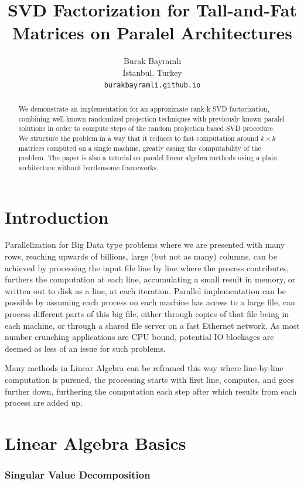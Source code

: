 \documentclass{article}
\title{SVD Factorization for Tall-and-Fat Matrices on Paralel Architectures}
\author{
  Burak Bayramlı \\
  İstanbul, Turkey\\
  \texttt{burakbayramli.github.io} 
}
\begin{document}
\maketitle

\begin{abstract}
We demonstrate an implementation for an approximate rank-k SVD factorization,
combining well-known randomized projection techniques with previously known
paralel solutions in order to compute steps of the random projection based SVD
procedure. We structure the problem in a way that it reduces to fast computation
around $k \times k$ matrices computed on a single machine, greatly easing the
computability of the problem. The paper is also a tutorial on paralel linear
algebra methods using a plain architecture without burdensome frameworks.
\end{abstract}



\section{Introduction}

Parallelization for Big Data type problems where we are presented with many
rows, reaching upwards of billions, large (but not as many) columns, can be
achieved by processing the input file line by line where the process
contributes, furthers the computation at each line, accumulating a small result
in memory, or written out to disk as a line, at each iteration. Parallel
implementation can be possible by assuming each process on each machine has
access to a large file, can process different parts of this big file, either
through copies of that file being in each machine, or through a shared file
server on a fast Ethernet network. As most number crunching applications are CPU
bound, potential IO blockages are deemed as less of an issue for such problems.

Many methods in Linear Algebra can be reframed this way where line-by-line
computation is pursued, the processing starts with first line, computes, and
goes further down, furthering the computation each step after which results from
each process are added up.

\section{Linear Algebra Basics}

\subsubsection{Singular Value Decomposition}
\end{document}
